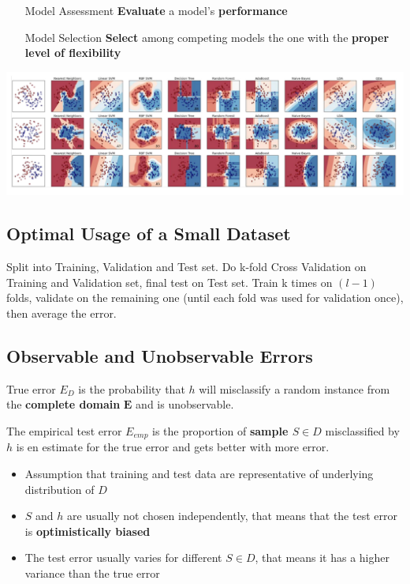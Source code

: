 \documentclass[11pt]{article}
\theoremstyle{definition}
\begin{document}
\begin{itemize}[leftmargin=*, labelindent=3cm, labelsep=1cm]
	\item[Model Assessment] \textbf{Evaluate} a model's \textbf{performance}
	\item[Model Selection] \textbf{Select} among competing models the one with the \textbf{proper level of flexibility}
\end{itemize}

\begin{center}
	\includegraphics[width=0.9\linewidth]{img/model_flexibility}
\end{center}

\subsection{Optimal Usage of a Small Dataset}
Split into Training, Validation and Test set. Do k-fold Cross Validation on Training and Validation set, final test on Test set. Train k times on $(l - 1)$ folds, validate on the remaining one (until each fold was used for validation once), then average the error.

\subsection{Observable and Unobservable Errors}
True error $E_D$ is the probability that $h$ will misclassify a random instance from the \textbf{complete domain} $\bm{E}$ and is unobservable.

The empirical test error $E_{emp}$ is the proportion of \textbf{sample $S\in D$} misclassified by $h$ is en estimate for the true error and gets better with more error.

\begin{itemize}
	\item Assumption that training and test data are representative of underlying distribution of $D$
	\item $S$ and $h$ are usually not chosen independently, that means that the test error is \textbf{optimistically biased}
	\item The test error usually varies for different $S\in D$, that means it has a higher variance than the true error
\end{itemize}
\end{document}

